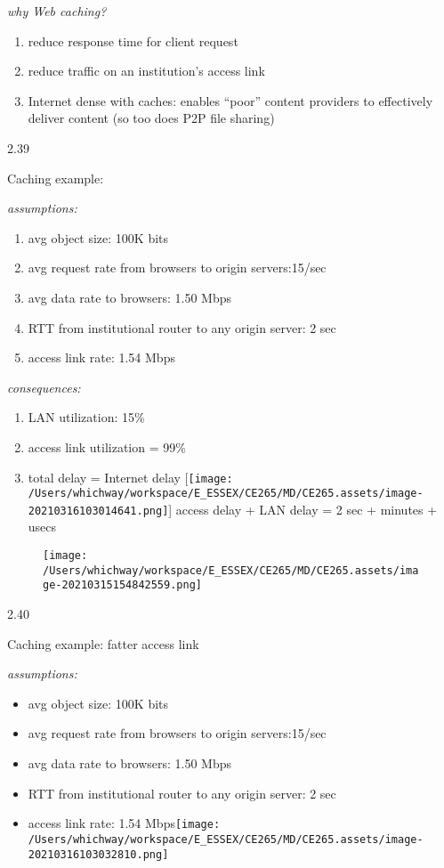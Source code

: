 \documentclass[
]{article}
\begin{document}
\emph{why Web caching?}

\begin{enumerate}
\def\labelenumi{\arabic{enumi}.}
\item
  reduce response time for client request
\item
  reduce traffic on an institution's access link
\item
  Internet dense with caches: enables ``poor'' content providers to
  effectively deliver content (so too does P2P file sharing)
\end{enumerate}

2.39

Caching example:

\emph{assumptions:}

\begin{enumerate}
\def\labelenumi{\arabic{enumi}.}
\item
  avg object size: 100K bits
\item
  avg request rate from browsers to origin servers:15/sec
\item
  avg data rate to browsers: 1.50 Mbps
\item
  RTT from institutional router to any origin server: 2 sec
\item
  access link rate: 1.54 Mbps
\end{enumerate}

\emph{consequences:}

\begin{enumerate}
\def\labelenumi{\arabic{enumi}.}
\item
  LAN utilization: 15\%
\item
  access link utilization = 99\%
\item
  total delay = Internet delay
  {[}\texttt{[image: /Users/whichway/workspace/E\_ESSEX/CE265/MD/CE265.assets/image-20210316103014641.png]}{]}
  access delay + LAN delay = 2 sec + minutes + usecs
\end{enumerate}

\begin{figure}
\centering
\texttt{[image: /Users/whichway/workspace/E\_ESSEX/CE265/MD/CE265.assets/image-20210315154842559.png]}
\caption{}
\end{figure}

2.40

Caching example: fatter access link

\emph{assumptions:}

\begin{itemize}
\item
  avg object size: 100K bits
\item
  avg request rate from browsers to origin servers:15/sec
\item
  avg data rate to browsers: 1.50 Mbps
\item
  RTT from institutional router to any origin server: 2 sec
\item
  access link rate: 1.54
  Mbps\texttt{[image: /Users/whichway/workspace/E\_ESSEX/CE265/MD/CE265.assets/image-20210316103032810.png]}
\end{itemize}
\end{document}
